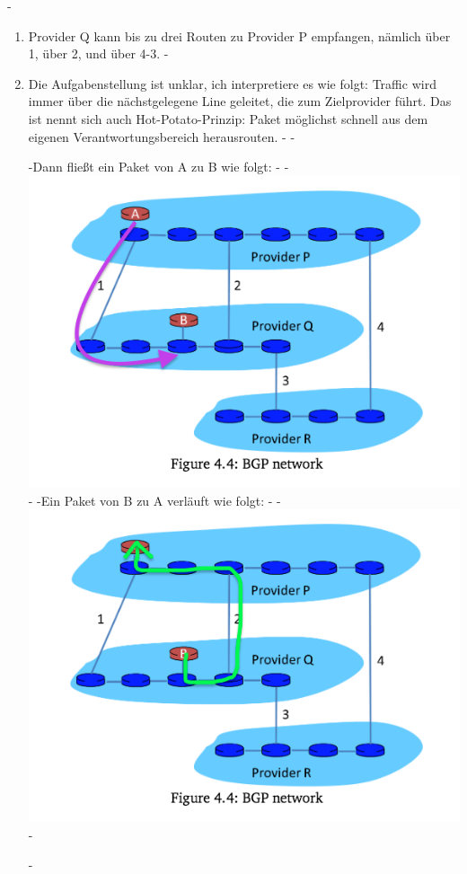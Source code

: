 \documentclass[a4paper,
			llpt,
			solution,
			accentcolor=tud2d,
			colorbacktitle
			]
			{tudexercise}
\newcommand{\8}{$\infty$}
\begin{document}
-\begin{enumerate}
-\item Provider Q kann bis zu drei Routen zu Provider P empfangen, nämlich über 1, über 2, und über 4-3.
-\item Die Aufgabenstellung ist unklar, ich interpretiere es wie folgt: Traffic wird immer über die nächstgelegene Line geleitet, die zum Zielprovider führt. Das ist nennt sich auch Hot-Potato-Prinzip: Paket möglichst schnell aus dem eigenen Verantwortungsbereich herausrouten.
-
-\begin{multicols}{2}
-Dann fließt ein Paket von A zu B wie folgt:
-
-\includegraphics[scale=0.4]{4_3_1_b_AB.png}
-
-Ein Paket von B zu A verläuft wie folgt:
-
-\includegraphics[scale=0.4]{4_3_1_b_BA.png}
-\end{multicols}
-\end{enumerate}
\end{document}
